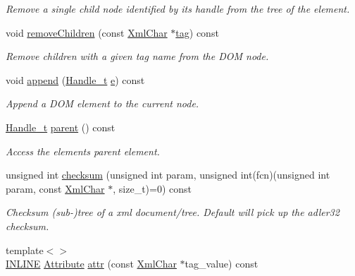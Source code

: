 \begin{DoxyCompactItemize}
\begin{DoxyCompactList}\small\item\em Remove a single child node identified by it\textquotesingle{}s handle from the tree of the element. \end{DoxyCompactList}\item 
void \hyperlink{class_d_d4hep_1_1_x_m_l_1_1_handle__t_a33c004e7806b7e868ca914900ed11611}{remove\+Children} (const \hyperlink{namespace_d_d4hep_1_1_x_m_l_a09e5d9cc86ed782f6826dfe0778c1815}{Xml\+Char} $\ast$\hyperlink{class_d_d4hep_1_1_x_m_l_1_1_handle__t_ac935379eb28cd33bc36f19c68da66143}{tag}) const
\begin{DoxyCompactList}\small\item\em Remove children with a given tag name from the D\+OM node. \end{DoxyCompactList}\item 
void \hyperlink{class_d_d4hep_1_1_x_m_l_1_1_handle__t_a9e3099d5e30d43e198472eec78d84142}{append} (\hyperlink{class_d_d4hep_1_1_x_m_l_1_1_handle__t}{Handle\+\_\+t} \hyperlink{_volumes_8cpp_a8a9a1f93e9b09afccaec215310e64142}{e}) const
\begin{DoxyCompactList}\small\item\em Append a D\+OM element to the current node. \end{DoxyCompactList}\item 
\hyperlink{class_d_d4hep_1_1_x_m_l_1_1_handle__t}{Handle\+\_\+t} \hyperlink{class_d_d4hep_1_1_x_m_l_1_1_handle__t_a989519c7f6229f809980cf9da81d8ed2}{parent} () const
\begin{DoxyCompactList}\small\item\em Access the element\textquotesingle{}s parent element. \end{DoxyCompactList}\item 
unsigned int \hyperlink{class_d_d4hep_1_1_x_m_l_1_1_handle__t_aa6a43630db57d335bacc39d075982f5c}{checksum} (unsigned int param, unsigned int(fcn)(unsigned int param, const \hyperlink{namespace_d_d4hep_1_1_x_m_l_a09e5d9cc86ed782f6826dfe0778c1815}{Xml\+Char} $\ast$, size\+\_\+t)=0) const
\begin{DoxyCompactList}\small\item\em Checksum (sub-\/)tree of a xml document/tree. Default will pick up the adler32 checksum. \end{DoxyCompactList}\item 
{\footnotesize template$<$$>$ }\\\hyperlink{_x_m_l_elements_8h_a2eb6f9e0395b47b8d5e3eeae4fe0c116}{I\+N\+L\+I\+NE} \hyperlink{namespace_d_d4hep_1_1_x_m_l_a5c19b7116be99d69b4b22d911357baaf}{Attribute} \hyperlink{class_d_d4hep_1_1_x_m_l_1_1_handle__t_a0a4cc20ab59c7dbb8bdd8e48db3a712b}{attr} (const \hyperlink{namespace_d_d4hep_1_1_x_m_l_a09e5d9cc86ed782f6826dfe0778c1815}{Xml\+Char} $\ast$tag\+\_\+value) const

\end{DoxyCompactItemize}
